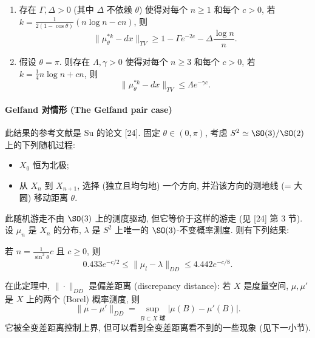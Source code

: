\begin{theorem}[随机反射的混合时间]
\label{thm:VI.6.4.1}
\begin{enumerate}
\item[(i)] 存在 $\Gamma, \Delta > 0$ (其中 $\Delta$ 不依赖 $\theta$) 使得对每个 $n \geq 1$ 和每个 $c > 0$, 若 $k = \frac{1}{2(1-\cos\theta)}(n\log n - cn)$, 则
\[
\|\mu_{\theta}^{*k} - dx\|_{TV} \geq 1 - \Gamma e^{-2c} - \Delta\frac{\log n}{n}.
\]
\item[(ii)] 假设 $\theta = \pi$. 则存在 $\Lambda, \gamma > 0$ 使得对每个 $n \geq 3$ 和每个 $c > 0$, 若 $k = \frac{1}{4}n\log n + cn$, 则
\[
\|\mu_{\theta}^{*k} - dx\|_{TV} \leq \Lambda e^{-\gamma c}.
\]
\end{enumerate}
\end{theorem}

\paragraph{Gelfand 对情形 (The Gelfand pair case)}
此结果的参考文献是 Su 的论文 {[}24{]}.
固定 $\theta \in (0, \pi)$, 考虑 $S^2 \simeq \SO(3)/\SO(2)$ 上的下列随机过程:
\begin{itemize}
\item $X_0$ 恒为北极;
\item 从 $X_n$ 到 $X_{n+1}$, 选择 (独立且均匀地) 一个方向, 并沿该方向的测地线 (= 大圆) 移动距离 $\theta$.
\end{itemize}
此随机游走不由 $\SO(3)$ 上的测度驱动, 但它等价于这样的游走 (见 {[}24{]} 第 3 节). 设 $\mu_n$ 是 $X_n$ 的分布, $\lambda$ 是 $S^2$ 上唯一的 $\SO(3)$-不变概率测度. 则有下列结果:

\begin{theorem}[球面上的随机游走]
\label{thm:VI.6.4.2}
若 $n = \frac{1}{\sin^2\theta}c$ 且 $c \geq 0$, 则
\[
0.433e^{-c/2} \leq \|\mu_l - \lambda\|_{DD} \leq 4.442e^{-c/8}.
\]
\end{theorem}

在此定理中, $\|\cdot\|_{DD}$ 是偏差距离 (discrepancy distance): 若 $X$ 是度量空间, $\mu, \mu'$ 是 $X$ 上的两个 (Borel) 概率测度, 则
\[
\|\mu - \mu'\|_{DD} = \sup_{B \subset X \text{ 球}}|\mu(B) - \mu'(B)|.
\]
它被全变差距离控制上界, 但可以看到全变差距离看不到的一些现象 (见下一小节).

